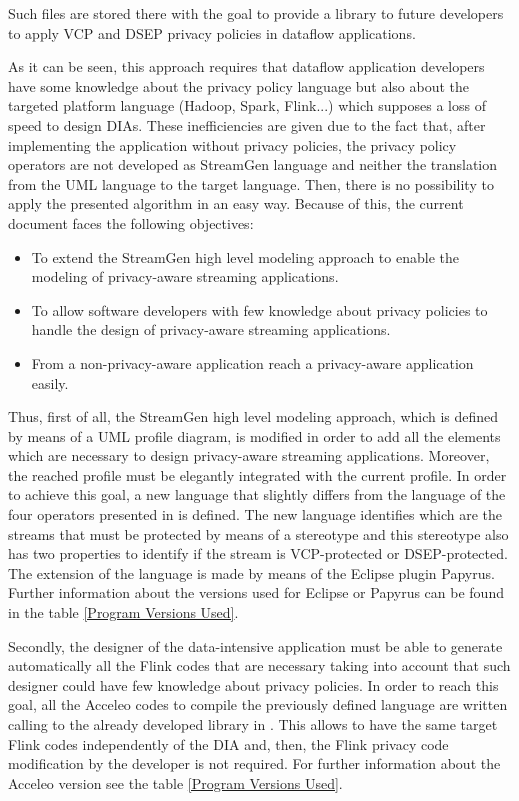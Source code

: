 Such files are stored there with the goal to provide a library to future developers to apply VCP and DSEP privacy policies in dataflow applications.

As it can be seen, this approach requires that dataflow application developers have some knowledge about the privacy policy language but also about the targeted platform language (Hadoop, Spark, Flink...) which supposes a loss of speed to design DIAs. These inefficiencies are given due to the fact that, after implementing the application without privacy policies, the privacy policy operators are not developed as StreamGen language and neither the translation from the UML language to the target language. Then, there is no possibility to apply the presented algorithm in an easy way. Because of this, the current document faces the following objectives:

\begin{itemize}
\item To extend the StreamGen high level modeling approach to enable the modeling of privacy-aware streaming applications.
\item To allow software developers with few knowledge about privacy policies to handle the design of privacy-aware streaming applications.
\item From a non-privacy-aware application reach a privacy-aware application easily.
\end{itemize}

Thus, first of all, the StreamGen high level modeling approach, which is defined by means of a UML profile diagram, is modified in order to add all the elements which are necessary to design privacy-aware streaming applications. Moreover, the reached profile must be elegantly integrated with the current profile. In order to achieve this goal, a new language that slightly differs from the language of the four operators presented in \cite{privacypoliciesarticle} is defined. The new language identifies which are the streams that must be protected by means of a stereotype and this stereotype also has two properties to identify if the stream is VCP-protected or DSEP-protected. The extension of the language is made by means of the Eclipse plugin Papyrus. Further information about the versions used for Eclipse or Papyrus can be found in the table \ref{Program Versions Used}.

Secondly, the designer of the data-intensive application must be able to generate automatically all the Flink codes that are necessary taking into account that such designer could have few knowledge about privacy policies. In order to reach this goal, all the Acceleo codes to compile the previously defined language are written calling to the already developed library in \cite{privacypoliciesarticle}. This allows to have the same target Flink codes independently of the DIA and, then, the Flink privacy code modification by the developer is not required. For further information about the Acceleo version see the table \ref{Program Versions Used}.

